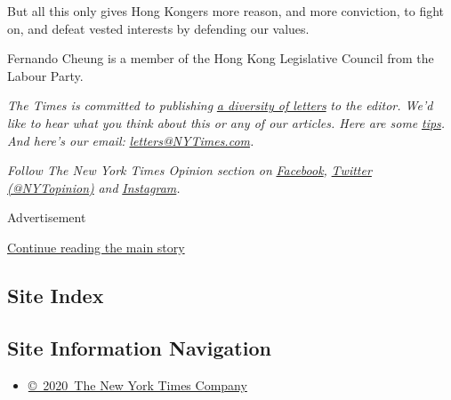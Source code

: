 But all this only gives Hong Kongers more reason, and more conviction,
to fight on, and defeat vested interests by defending our values.

Fernando Cheung is a member of the Hong Kong Legislative Council from
the Labour Party.

\emph{The Times is committed to publishing}
\href{https://www.nytimes3xbfgragh.onion/2019/01/31/opinion/letters/letters-to-editor-new-york-times-women.html}{\emph{a
diversity of letters}} \emph{to the editor. We'd like to hear what you
think about this or any of our articles. Here are some}
\href{https://help.nytimes3xbfgragh.onion/hc/en-us/articles/115014925288-How-to-submit-a-letter-to-the-editor}{\emph{tips}}\emph{.
And here's our email:}
\href{mailto:letters@NYTimes.com}{\emph{letters@NYTimes.com}}\emph{.}

\emph{Follow The New York Times Opinion section on}
\href{https://www.facebookcorewwwi.onion/nytopinion}{\emph{Facebook}}\emph{,}
\href{http://twitter.com/NYTOpinion}{\emph{Twitter (@NYTopinion)}}
\emph{and}
\href{https://www.instagram.com/nytopinion/}{\emph{Instagram}}\emph{.}

Advertisement

\protect\hyperlink{after-bottom}{Continue reading the main story}

\hypertarget{site-index}{%
\subsection{Site Index}\label{site-index}}

\hypertarget{site-information-navigation}{%
\subsection{Site Information
Navigation}\label{site-information-navigation}}

\begin{itemize}
\tightlist
\item
  \href{https://help.nytimes3xbfgragh.onion/hc/en-us/articles/115014792127-Copyright-notice}{©~2020~The
  New York Times Company}
\end{itemize}

